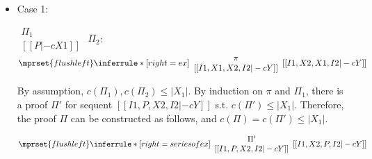 \begin{itemize}
\item Case 1:
      \begin{center}
        \scriptsize
        \begin{math}
          \begin{array}{c}
            \Pi_1 \\
            {[[P |-c X1]]}
          \end{array}
        \end{math}
        \qquad\qquad
        $\Pi_2$:
        \begin{math}
          $$\mprset{flushleft}
          \inferrule* [right={\tiny ex}] {
            {
              \begin{array}{c}
                \pi \\
                {[[I1, X1, X2, I2 |-c Y]]}
              \end{array}
            }
          }{[[I1, X2, X1, I2 |-c Y]]}
        \end{math}
      \end{center}
      By assumption, $c(\Pi_1),c(\Pi_2)\leq |X_1|$. By induction on $\pi$
      and $\Pi_1$, there is a proof $\Pi'$ for sequent
      $[[I1, P, X2, I2 |-c Y]]$ s.t. $c(\Pi')\leq|X_1|$. Therefore, the
      proof $\Pi$ can be constructed as follows, and
      $c(\Pi)=c(\Pi')\leq|X_1|$.
      \begin{center}
        \scriptsize
        \begin{math}
          $$\mprset{flushleft}
          \inferrule* [right={\tiny series of ex}] {
            {
              \begin{array}{c}
                \Pi' \\
                {[[I1, P, X2, I2 |-c Y]]}
              \end{array}
            }
          }{[[I1, X2, P, I2 |-c Y]]}
        \end{math}
      \end{center}


\end{itemize}

